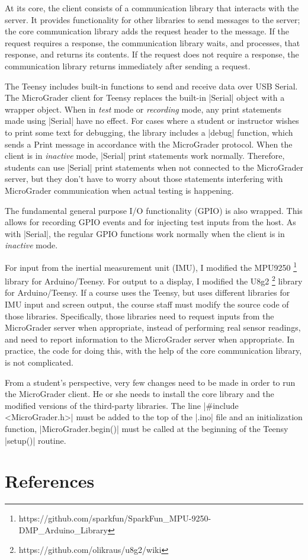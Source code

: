 \documentclass[12pt]{article}
\begin{document}
At its core, the client consists of a communication library that interacts with the server.  It provides functionality for other libraries to send messages to the server; the core communication library adds the request header to the message.  If the request requires a response, the communication library waits, and processes, that response, and returns its contents.  If the request does not require a response, the communication library returns immediately after sending a request.

The Teensy includes built-in functions to send and receive data over USB Serial.  The MicroGrader client for Teensy replaces the built-in |Serial| object with a wrapper object.  When in \textit{test} mode or \textit{recording} mode, any print statements made using |Serial| have no effect.  For cases where a student or instructor wishes to print some text for debugging, the library includes a |debug| function, which sends a Print message in accordance with the MicroGrader protocol.  When the client is in \textit{inactive} mode, |Serial| print statements work normally.  Therefore, students can use |Serial| print statements when not connected to the MicroGrader server, but they don't have to worry about those statements interfering with MicroGrader communication when actual testing is happening.

The fundamental general purpose I/O functionality (GPIO) is also wrapped.  This allows for recording GPIO events and for injecting test inputs from the host.  As with |Serial|, the regular GPIO functions work normally when the client is in \textit{inactive} mode. 

For input from the inertial measurement unit (IMU), I modified the MPU9250 \footnote{https://github.com/sparkfun/SparkFun\_MPU-9250-DMP\_Arduino\_Library} library for Arduino/Teensy.  For output to a display, I modified the U8g2 \footnote{https://github.com/olikraus/u8g2/wiki} library for Arduino/Teensy.  If a course uses the Teensy, but uses different libraries for IMU input and screen output, the course staff must modify the source code of those libraries.  Specifically, those libraries need to request inputs from the MicroGrader server when appropriate, instead of performing real sensor readings, and need to report information to the MicroGrader server when appropriate.  In practice, the code for doing this, with the help of the core communication library, is not complicated.

From a student's perspective, very few changes need to be made in order to run the MicroGrader client.  He or she needs to install the core library and the modified versions of the third-party libraries.  The line |#include <MicroGrader.h>| must be added to the top of the |.ino| file and an initialization function, |MicroGrader.begin()| must be called at the beginning of the Teensy |setup()| routine.

\newpage
\section{References}
\end{document}
